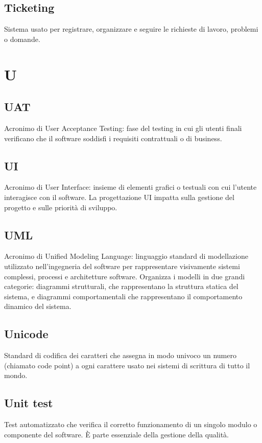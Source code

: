 \documentclass[a4paper,12pt]{article}
\begin{document}
          \subsection*{Ticketing}
			Sistema usato per registrare, organizzare e seguire le richieste di lavoro, problemi o domande.
        
\newpage
        \section{U}
        
          \subsection*{UAT}
			Acronimo di User Acceptance Testing: fase del testing in cui gli utenti finali verificano che il software soddisfi i requisiti contrattuali o di business.
          \subsection*{UI}
			Acronimo di User Interface: insieme di elementi grafici o testuali con cui l'utente interagisce con il software. La progettazione UI impatta sulla gestione del progetto e sulle priorità di sviluppo.
          \subsection*{UML}
			Acronimo di Unified Modeling Language: linguaggio standard di modellazione utilizzato nell'ingegneria del software per rappresentare visivamente sistemi complessi, processi e architetture software. Organizza i modelli in due grandi categorie: diagrammi strutturali, che rappresentano la struttura statica del sistema, e diagrammi comportamentali che rappresentano il comportamento dinamico del sistema.
          \subsection*{Unicode}
			Standard di codifica dei caratteri che assegna in modo univoco un numero (chiamato code point) a ogni carattere usato nei sistemi di scrittura di tutto il mondo.
          \subsection*{Unit test}
			Test automatizzato che verifica il corretto funzionamento di un singolo modulo o componente del software. È parte essenziale della gestione della qualità.
\end{document}
